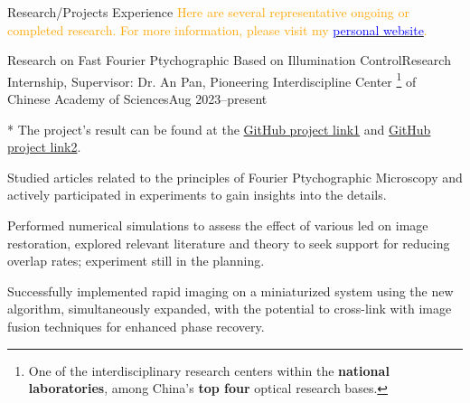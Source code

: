\documentclass[]{kyvernitis-resume}
\begin{document}
\begin{section}{\Large Research/Projects Experience}
\vspace{0.2cm}
{\small \textcolor{orange}{Here are several representative ongoing or completed research. For more information, please visit my }\href{https://wang-zhiping.github.io/}{\textcolor{blue}{personal website}}\textcolor{orange}{.}}



    \begin{subsection}{Research on Fast Fourier Ptychographic Based on Illumination Control}{Research Internship, Supervisor: Dr. An Pan, Pioneering Interdiscipline Center \footnote{One of the interdisciplinary research centers within the \textbf{national laboratories}, among China's \textbf{top four} optical research bases.}
 of Chinese Academy of Sciences}{Aug 2023--present}{}
     \item[*] The project's result can be found at the \href{https://wang-zhiping.github.io/ResearchSummary&Reporting/FPM/single-fast.html}{GitHub project link1} and  \href{https://wang-zhiping.github.io/ResearchSummary&Reporting/FPM/fusion.html}{GitHub project link2}.
        \item Studied articles related to the principles of Fourier Ptychographic Microscopy and actively participated in experiments to gain insights into the details.
        \item Performed numerical simulations to assess the effect of various led on image restoration, explored relevant literature and theory to seek support for reducing overlap rates;  experiment still in the planning.
        \item Successfully implemented rapid imaging on a miniaturized system using the new algorithm, simultaneously expanded, with the potential to cross-link with image fusion techniques for enhanced phase recovery.

    
    \end{subsection}



\end{section}
\end{document}
